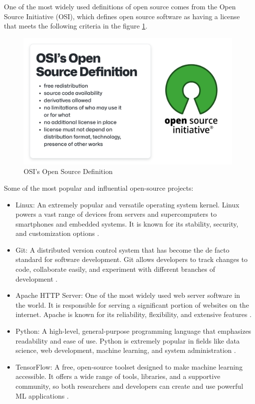One of the most widely used definitions of open source comes from the Open Source Initiative (OSI), which defines open source software as having a license that meets the following criteria in the figure \ref{fig:osidef}.

\begin{figure}[ht]
    \includegraphics[width=12cm]{figs/osiopensourcedef.png}
    \centering
    \caption{OSI's Open Source Definition \cite{HaeussgeDevGuide}}
    \label{fig:osidef}
\end{figure}



Some of the most popular and influential open-source projects:
\begin{itemize}
    \item Linux: An extremely popular and versatile operating system kernel. Linux powers a vast range of devices from servers and supercomputers to smartphones and embedded systems. It is known for its stability, security, and customization options \cite{fink2003business}.
    \item Git: A distributed version control system that has become the de facto standard for software development. Git allows developers to track changes to code, collaborate easily, and experiment with different branches of development \cite{loeliger2012version}.
    \item Apache HTTP Server: One of the most widely used web server software in the world. It is responsible for serving a significant portion of websites on the internet. Apache is known for its reliability, flexibility, and extensive features \cite{fielding1997apache}.
    \item Python: A high-level, general-purpose programming language that emphasizes readability and ease of use. Python is extremely popular in fields like data science, web development, machine learning, and system administration \cite{srinath2017python}.
    \item TensorFlow: A free, open-source toolset designed to make machine learning accessible. It offers a wide range of tools, libraries, and a supportive community, so both researchers and developers can create and use powerful ML applications \cite{developers2022tensorflow}.
\end{itemize}

